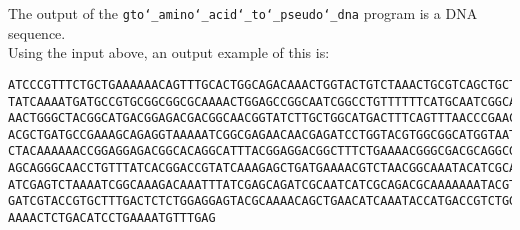 The output of the \texttt{gto\char`_amino\char`_acid\char`_to\char`_pseudo\char`_dna} program is a DNA sequence.\\
Using the input above, an output example of this is:
\begin{lstlisting}
ATCCCGTTTCTGCTGAAAAAACAGTTTGCACTGGCAGACAAACTGGTACTGTCTAAACTGCGTCAGCTGCTGGGCGGCCG
TATCAAAATGATGCCGTGCGGCGGCGCAAAACTGGAGCCGGCAATCGGCCTGTTTTTTCATGCAATCGGCATCAACATCA
AACTGGGCTACGGCATGACGGAGACGACGGCAACGGTATCTTGCTGGCATGACTTTCAGTTTAACCCGAACTCTATCGGC
ACGCTGATGCCGAAAGCAGAGGTAAAAATCGGCGAGAACAACGAGATCCTGGTACGTGGCGGCATGGTAATGAAAGGCTA
CTACAAAAAACCGGAGGAGACGGCACAGGCATTTACGGAGGACGGCTTTCTGAAAACGGGCGACGCAGGCGAGTTTGACG
AGCAGGGCAACCTGTTTATCACGGACCGTATCAAAGAGCTGATGAAAACGTCTAACGGCAAATACATCGCACCGCAGTAC
ATCGAGTCTAAAATCGGCAAAGACAAATTTATCGAGCAGATCGCAATCATCGCAGACGCAAAAAAATACGTATCTGCACT
GATCGTACCGTGCTTTGACTCTCTGGAGGAGTACGCAAAACAGCTGAACATCAAATACCATGACCGTCTGGAGCTGCTGA
AAAACTCTGACATCCTGAAAATGTTTGAG
\end{lstlisting}
